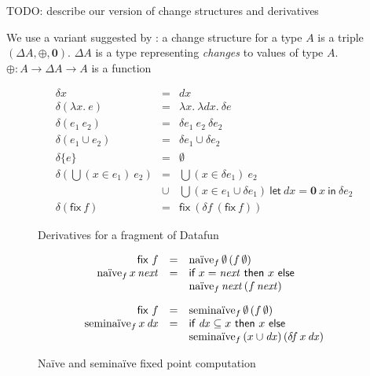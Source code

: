 \documentclass[sigplan,screen,review,timestamp,dvipsnames]{acmart}
\newcommand{\todo}[1]{{\color{ACMPurple}#1}}
\newcommand{\fn}{\lambda}
\newcommand{\binder}{.~}
\newcommand{\bind}[1]{#1\binder}
\newcommand{\fnof}[1]{\fn\bind{#1}}
\renewcommand{\d}{\delta}
\newcommand{\dzero}{\mathbf{0}~} %
\newcommand{\kw}[1]{\textsf{#1}}
\newcommand{\tlv}[1]{\textrm{#1}}
\newcommand{\var}[1]{\mathit{#1}}
\newcommand{\dee}[1]{\var{d#1}}
\newcommand{\subst}[1]{\,[#1]}
\newcommand{\ebiglub}[1]{\bigcup(#1)~}
\newcommand{\elet}[1]{\kw{let}~#1~\kw{in}~}
\newcommand{\efix}{\kw{fix}~}
\begin{document}
\todo{TODO: describe our version of change structures and derivatives}

\newcommand{\D}{\Delta}
\newcommand{\zero}{\mathbf{0}}

We use a variant suggested by \citet{atkey-changes}: a change structure for a
type $A$ is a triple $(\D A, \oplus, \zero)$. $\D A$ is a type representing
\emph{changes} to values of type $A$.
%
$\oplus : A \to \Delta A \to A$ is a function 

\begin{figure}
  \[\begin{array}{rcl}
    \d x &=& dx\\
    \d(\fnof x e) &=& \fnof x \fnof{\dee x} \d{e}\\
    \d(e_1~e_2) &=& \d{e_1}~e_2~\d{e_2}\\
    \d(e_1 \cup e_2) &=& \d{e_1} \cup \d{e_2}\\
    \d{\{e\}} &=& \emptyset\\
    \d(\ebiglub{x \in e_1} e_2)
    &=& \ebiglub{x \in \d{e_1}} e_2\\
    &\cup& \ebiglub{x \in e_1 \cup \d{e_1}}
    \elet{\dee x = \dzero x}
    \d{e_2}
    \\
    \d(\efix f) &=& \efix (\d\!f~(\efix f))
  \end{array}\]
  \caption{Derivatives for a fragment of Datafun}
  \label{fig:derivatives}
\end{figure}

\begin{figure}
  \[
  \begin{array}{rcl}
  \efix f &=& \tlv{na\"ive}_f \,\emptyset \,(f\, \emptyset)\\
  \tlv{na\"ive}_f \,x \,\var{next}
  &=& \kw{if}~ x = \var{next} ~\kw{then}~ x ~\kw{else}\\
  && \tlv{na\"ive}_f \,\var{next} \,(f \,\var{next})

  \vspace{1em}\\

  \efix f &=& \tlv{semina\"ive}_f \,\emptyset \,(f\, \emptyset)\\
  \tlv{semina\"ive}_f \,x \,\dee x
  &=& \kw{if}~ \dee x \subseteq x ~\kw{then}~ x ~\kw{else}\\
  && \tlv{semina\"ive}_f \,(x \cup \dee x) \,(\d\!f \,x \,\dee x)

  \end{array}
  \]
  \caption{Na\"ive and semina\"ive fixed point computation}
  \label{fig:defining-fix}
\end{figure}
\end{document}
